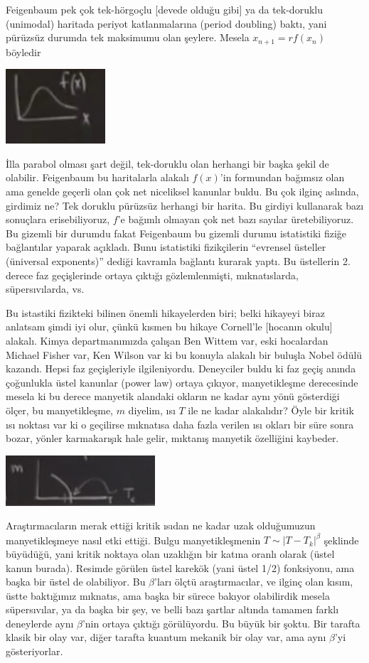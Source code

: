 \documentclass[12pt,fleqn]{article}\usepackage{../../common}
\begin{document}
Feigenbaum pek çok tek-hörgoçlu [devede olduğu gibi] ya da tek-doruklu
(unimodal) haritada periyot katlanmalarına (period doubling) baktı, yani
pürüzsüz durumda tek maksimumu olan şeylere. Mesela $x_{n+1} = r f(x_n)$
böyledir

\includegraphics[width=10em]{20_01.png}

İlla parabol olması şart değil, tek-doruklu olan herhangi bir başka şekil de
olabilir. Feigenbaum bu haritalarla alakalı $f(x)$'in formundan bağımsız olan
ama genelde geçerli olan çok net niceliksel kanunlar buldu. Bu çok ilginç
aslında, girdimiz ne? Tek doruklu pürüzsüz herhangi bir harita. Bu girdiyi
kullanarak bazı sonuçlara erisebiliyoruz, $f$'e bağımlı olmayan çok net bazı
sayılar üretebiliyoruz. Bu gizemli bir durumdu fakat Feigenbaum bu gizemli
durumu istatistiki fiziğe bağlantılar yaparak açıkladı. Bunu istatistiki
fizikçilerin ``evrensel üsteller (üniversal exponents)'' dediği kavramla
bağlantı kurarak yaptı. Bu üstellerin 2. derece faz geçişlerinde ortaya çıktığı
gözlemlenmişti, mıknatıslarda, süpersıvılarda, vs.

Bu istastiki fizikteki bilinen önemli hikayelerden biri; belki hikayeyi
biraz anlatsam şimdi iyi olur, çünkü kısmen bu hikaye Cornell'le [hocanın
okulu] alakalı. Kimya departmanımızda çalışan Ben Wittem var, eski
hocalardan Michael Fisher var, Ken Wilson var ki bu konuyla alakalı bir
buluşla Nobel ödülü kazandı. Hepsi faz geçişleriyle
ilgileniyordu. Deneyciler buldu ki faz geçiş anında çoğunlukla üstel
kanunlar (power law) ortaya çıkıyor, manyetikleşme derecesinde mesela ki bu
derece manyetik alandaki okların ne kadar aynı yönü gösterdiği ölçer, bu
manyetikleşme, $m$ diyelim, ısı $T$ ile ne kadar alakalıdır? Öyle bir
kritik ısı noktası var ki o geçilirse mıknatısa daha fazla verilen ısı
okları bir süre sonra bozar, yönler karmakarışık hale gelir, mıktanış
manyetik özelliğini kaybeder.

\includegraphics[width=15em]{20_02.png}

Araştırmacıların merak ettiği kritik ısıdan ne kadar uzak olduğumuzun
manyetikleşmeye nasıl etki ettiği. Bulgu manyetikleşmenin $T \sim |T-T_k|^\beta$
şeklinde büyüdüğü, yani kritik noktaya olan uzaklığın bir katına oranlı olarak
(üstel kanun burada). Resimde görülen üstel karekök (yani üstel 1/2) fonksiyonu,
ama başka bir üstel de olabiliyor. Bu $\beta$'ları ölçtü araştırmacılar, ve
ilginç olan kısım, üstte baktığımız mıknatıs, ama başka bir sürece bakıyor
olabilirdik mesela süpersıvılar, ya da başka bir şey, ve belli bazı şartlar
altında tamamen farklı deneylerde aynı $\beta$'nin ortaya çıktığı
görülüyordu. Bu büyük bir şoktu. Bir tarafta klasik bir olay var, diğer tarafta
kuantum mekanik bir olay var, ama aynı $\beta$'yi gösteriyorlar. 
\end{document}
